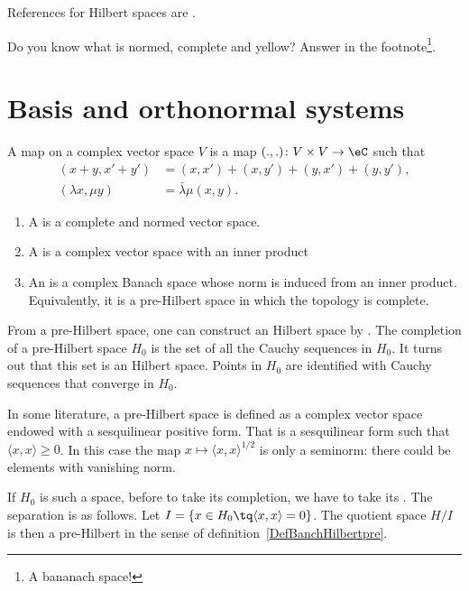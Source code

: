 
References for Hilbert spaces are \cite{Wassermann,Landsman}.

Do you know what is normed, complete and yellow? Answer in the footnote\footnote{A bananach space!}.

\section{Basis and orthonormal systems}

A  map on a complex vector space $V$ is a map $(.,.)\colon V\times V\to \eC$ such that
\[
\begin{split}
(x+y,x'+y')&=(x,x')+(x,y')+(y,x')+(y,y'),\\
(\lambda x,\mu y)&=\bar\lambda\mu(x,y).
\end{split}
\]

\begin{definition}		\label{DefBanchHilbertpre}
	\begin{enumerate}
		\item
			A  is a complete and normed vector space.
		\item
			A  is a complex vector space with an inner product
		\item
			An  is a complex Banach space whose norm is induced from an inner product. Equivalently, it is a pre-Hilbert space in which the topology is complete.
	\end{enumerate}
\end{definition}

From a pre-Hilbert space, one can construct an Hilbert space by . The completion of a pre-Hilbert space $H_0$ is the set of all the Cauchy sequences in $H_0$. It turns out that this set is an Hilbert space. Points in $H_0$ are identified with Cauchy sequences that converge in $H_0$.

\begin{remark}
	In some literature\cite{AlgOpGirard}, a pre-Hilbert space is defined as a complex vector space endowed with a sesquilinear positive form. That is a sesquilinear form such that $\langle x, x\rangle \geq 0$. In this case the map $x\mapsto\langle x, x\rangle ^{1/2}$ is only a seminorm: there could be elements with vanishing norm.

	If $H_0$ is such a space, before to take its completion, we have to take its . The separation is as follows. Let $I=\{ x\in H_0\tq \langle x, x\rangle =0 \}$. The quotient space $H/I$ is then a pre-Hilbert in the sense of definition~\ref{DefBanchHilbertpre}.
\end{remark}

